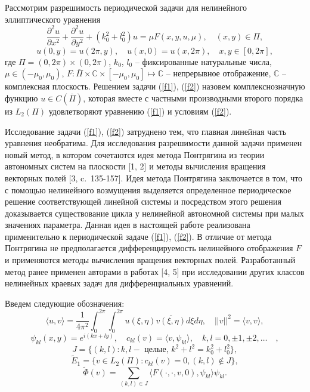 
\vzmscaption

Рассмотрим разрешимость периодической задачи для нелинейного
эллиптического уравнения
\begin{equation}\label{f1}
\frac{\partial^2u}{\partial x^2}+\frac{\partial^2u}{\partial
y^2}+(k_0^2+l_0^2)u=\mu F(x,y,u,\mu), \quad (x, y)\in \Pi,
\end{equation}
\begin{equation}\label{f2}
u(0,y)=u(2\pi ,y), \quad u(x,0)=u(x,2\pi), \quad x, y\in [0,
2\pi],
\end{equation}
где $\Pi=(0,2\pi)\times (0,2\pi)$, $k_0$, $l_0$ -- фиксированные натуральные числа, $\mu\in
(-\mu_0, \mu_0)$, $F : \overline{\Pi}\times \mathbb{C}\times
[-\mu_0, \mu_0]\mapsto \mathbb{C}$ -- непрерывное отображение,
$\mathbb{C}$ -- комплексная плоскость. Решением задачи (\ref{f1}),
(\ref{f2}) назовем комплекснозначную функцию $u\in
C(\overline{\Pi})$, которая вместе с частными производными второго
порядка из $L_2(\Pi)$ удовлетворяют уравнению (\ref{f1}) и
условиям (\ref{f2}).

Исследование задачи (\ref{f1}), (\ref{f2}) затруднено тем, что
главная линейная часть уравнения необратима. Для исследования
разрешимости данной задачи применен новый метод, в котором
сочетаются идея метода Понтрягина из теории автономных систем на
плоскости [1, 2] и методы вычисления вращения векторных полей [3, c.~135-157].
Идея метода Понтрягина заключается
в том, что с помощью нелинейного возмущения выделяется
определенное периодическое решение соответствующей линейной
системы и посредством этого решения доказывается существование
цикла у нелинейной автономной системы при малых значениях
параметра. Данная идея в настоящей работе реализована
применительно к периодической задаче (\ref{f1}), (\ref{f2}). В
отличие от метода Понтрягина не предполагается дифференцируемость
нелинейного отображения $F$ и применяются методы вычисления
вращения векторных полей.
Разработанный метод ранее применен авторами в работах [4, 5] 
при исследовании других классов нелинейных краевых
задач для дифференциальных уравнений.

Введем следующие обозначения:
$$
\langle u , v \rangle =
\frac{1}{4\pi^2}\int_0^{2\pi}\int_0^{2\pi}u(\xi,\eta)\overline{v(\xi,\eta)}d\xi
d\eta, \quad ||v||^2=\langle v , v \rangle,
$$
$$
\psi_{kl}(x,y)=e^{i(kx+ly)}, \quad c_{kl}(v)=\langle v , \psi_{kl}\rangle,
\quad k, l = 0, \pm 1, \pm 2, \ldots \quad ,
$$
$$
J=\{(k,l): k, l - \mbox{ целые, } k^2+l^2=k_0^2+l_0^2 \},
$$
$$
\widetilde{E}_1=\{ v\in L_2(\Pi):  c_{kl}(v)=0, (k,l)\not\in J \},
$$
$$
\widetilde{\Phi}(v)=\sum_{(k,l)\in
J}\langle F(\cdot,\cdot,v,0),\psi_{kl}\rangle\psi_{kl}.
$$

